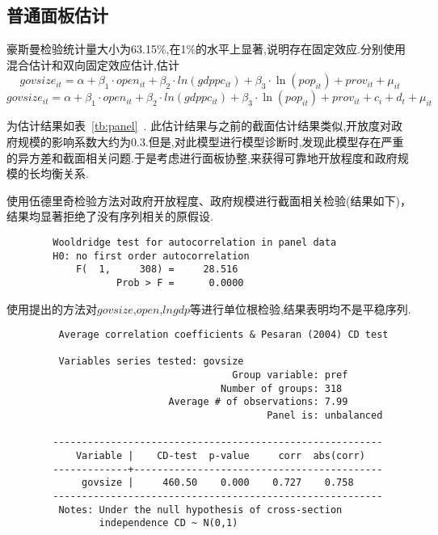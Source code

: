 \documentclass[10pt]{article}
\begin{document}
\subsection{普通面板估计}
    豪斯曼检验统计量大小为63.15\%,在1\%的水平上显著,说明存在固定效应.分别使用混合估计和双向固定效应估计,估计
    \begin{equation}
        govsize_{it} = \alpha + \beta_{1} \cdot open_{it} + \beta_{2} \cdot ln(gdppc_{it}) + \beta_{3} \cdot \ln(pop_{it}) + prov_{it} + \mu_{it}
    \end{equation}
    \begin{equation}    
        govsize_{it} = \alpha + \beta_{1} \cdot open_{it} + \beta_{2} \cdot ln(gdppc_{it}) + \beta_{3} \cdot \ln(pop_{it}) + prov_{it} +c_{i} +d_{t} + \mu_{it}
    \end{equation}
    
    为估计结果如表~\ref{tb:panel}~.
    此估计结果与之前的截面估计结果类似,开放度对政府规模的影响系数大约为0.3.但是,对此模型进行模型诊断时,发现此模型存在严重的异方差和截面相关问题.于是考虑进行面板协整,来获得可靠地开放程度和政府规模的长均衡关系.

    使用伍德里奇检验方法\cite{wooldridge2010econometric}对政府开放程度、政府规模进行截面相关检验(结果如下)，结果均显著拒绝了没有序列相关的原假设.

    \begin{framed}
    \begin{verbatim}
        Wooldridge test for autocorrelation in panel data
        H0: no first order autocorrelation
            F(  1,     308) =     28.516
                   Prob > F =      0.0000
    \end{verbatim}
    \end{framed}


    使用\cite{moon2004testing}提出的方法对$govsize$,$open$,$lngdp$等进行单位根检验,结果表明均不是平稳序列.
     \begin{framed}
    \begin{verbatim}
         Average correlation coefficients & Pesaran (2004) CD test

         Variables series tested: govsize
                                       Group variable: pref
                                     Number of groups: 318
                            Average # of observations: 7.99
                                             Panel is: unbalanced

        ---------------------------------------------------------
            Variable |    CD-test  p-value     corr  abs(corr)
        -------------+-------------------------------------------
             govsize |     460.50    0.000    0.727    0.758
        ---------------------------------------------------------
         Notes: Under the null hypothesis of cross-section 
                independence CD ~ N(0,1)
    \end{verbatim}
    \end{framed}
\end{document}
